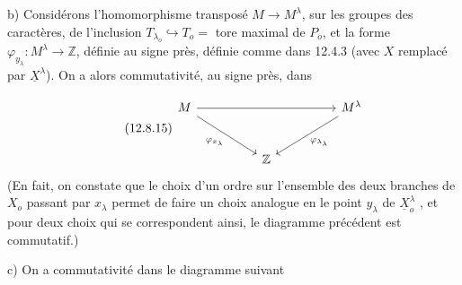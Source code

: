 b)  Considérons l'homomorphisme transposé $M \longrightarrow M^{\lambda}$, sur les groupes des caractères, de l'inclusion $T_{\lambda_{o}} \hookrightarrow T_{o} =$ tore maximal de $P_{o}$, et la forme $\varphi_{y_{\lambda}} : M^{\lambda} \longrightarrow \mathbb{Z}$, définie au signe près, définie comme dans 12.4.3 (avec $X$ remplacé par $\underline{X}^{\lambda}$). On a alors commutativité, au signe près, dans

\begin{equation}\tag{12.8.15}
\begin{tikzcd}[column sep=huge, row sep=large]
M \arrow[rr] \arrow[dr, "\varphi_{x_{\lambda}}"'] & & M^{\lambda} \arrow[dl, "\varphi_{\lambda_{\lambda}}"] \\
 & \mathbb{Z} &
\end{tikzcd}
\end{equation}
(En fait, on constate que le choix d'un ordre sur l'ensemble des deux branches de $X_{o}$ passant par $x_{\lambda}$ permet de faire un choix analogue en le point $y_{\lambda}$ de $\underline{X}^{\lambda}_{o}$ , et pour deux choix qui se correspondent ainsi, le diagramme précédent est commutatif.)

c)  On a commutativité dans le diagramme suivant

